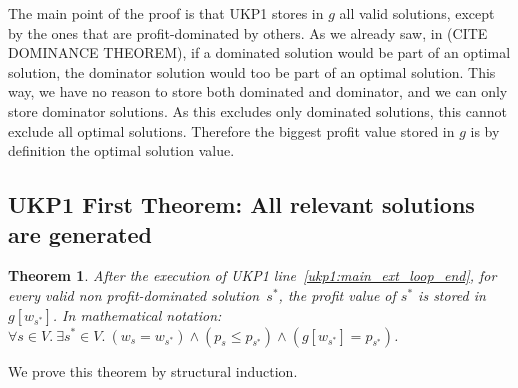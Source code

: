 \documentclass[12pt]{article}
\newtheorem{theorem}{Theorem}
\begin{document}
The main point of the proof is that UKP1 stores in \(g\) all valid solutions, except by the ones that are profit-dominated by others. As we already saw, in (CITE DOMINANCE THEOREM), if a dominated solution would be part of an optimal solution, the dominator solution would too be part of an optimal solution. This way, we have no reason to store both dominated and dominator, and we can only store dominator solutions. As this excludes only dominated solutions, this cannot exclude all optimal solutions. Therefore the biggest profit value stored in \(g\) is by definition the optimal solution value.

\subsection{UKP1 First Theorem: All relevant solutions are generated}


\begin{theorem}\label{theo:ukp1:all_relevant_solutions_present}
After the execution of UKP1 line~\ref{ukp1:main_ext_loop_end}, for every valid non profit-dominated solution~\(s^*\), the profit value of \(s^*\) is stored in \(g[w_{s^*}]\). In mathematical notation: \(\forall s \in V.~\exists s^* \in V.~(w_s = w_{s^*}) \land (p_s \leq p_{s^*}) \land (g[w_{s^*}] = p_{s^*})\).
\end{theorem}

We prove this theorem by structural induction.
\end{document}
